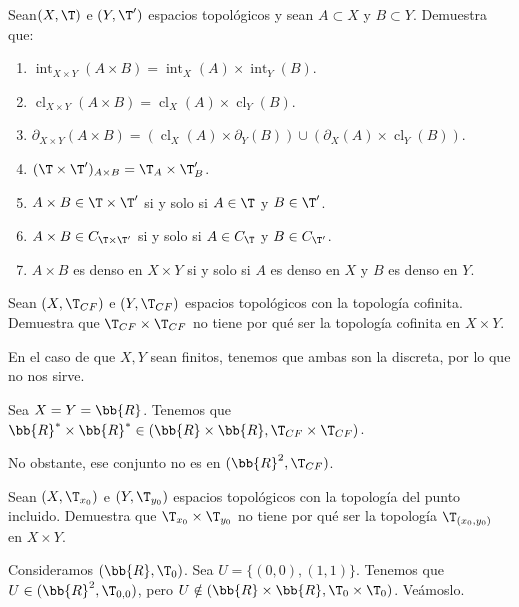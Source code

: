 \begin{ejercicio}
    Sean$ (X,\T)$ e $(Y, \T')$ espacios topológicos y sean $A \subset X$ y $B \subset Y$. Demuestra que:
    \begin{enumerate}
        \item $\operatorname{int}_{X\times Y}(A \times B) = \operatorname{int}_X(A) \times \operatorname{int}_Y (B)$.
        \item $\operatorname{cl}_{X\times Y} (A \times B) = \operatorname{cl}_X(A) \times \operatorname{cl}_Y (B)$.
        \item $\partial_{X\times Y} (A \times B) = (\operatorname{cl}_X(A) \times \partial_Y (B)) \cup (\partial_X(A) \times \operatorname{cl}_Y (B))$.
        \item $(\T \times \T')_{A\times B} = \T_A \times \T'_B$.
        \item $A \times B \in \T \times \T'$ si y solo si $A \in \T$ y $B \in \T'$.
        \item $A \times B \in C_{\T \times \T'}$ si y solo si $A \in C_\T$ y $B \in C_{\T'}$.
        \item $A \times B$ es denso en $X \times Y$ si y solo si $A$ es denso en $X$ y $B$ es denso en $Y$.
    \end{enumerate}
\end{ejercicio}

\begin{ejercicio}
    Sean $(X, \T_{CF})$ e $(Y, \T_{CF})$ espacios topológicos con la topología cofinita. Demuestra que $\T_{CF}\times \T_{CF}$ no tiene por qué ser la topología cofinita en $X \times Y$.

    En el caso de que $X,Y$ sean finitos, tenemos que ambas son la discreta, por lo que no nos sirve.

    Sea $X=Y=\bb{R}$. Tenemos que $\bb{R}^\ast\times \bb{R}^\ast \in (\bb{R}\times \bb{R}, \T_{CF}\times \T_{CF})$.

    No obstante, ese conjunto no es en $(\bb{R}^2, \T_{CF})$.
\end{ejercicio}


\begin{ejercicio}
    Sean $(X, \T_{x_0})$ e $(Y, \T_{y_0})$ espacios topológicos con la topología del punto incluido. Demuestra que $\T_{x_0} \times \T_{y_0}$ no tiene por qué ser la topología $\T_{(x_0,y_0)}$ en $X \times Y$.

    Consideramos $(\bb{R},\T_{0})$. Sea $U=\{(0,0), (1,1)\}$. Tenemos que $U\in (\bb{R}^2, \T_{0,0})$, pero $U\notin (\bb{R}\times \bb{R}, \T_0\times \T_0)$. Veámoslo.

    
\end{ejercicio}


